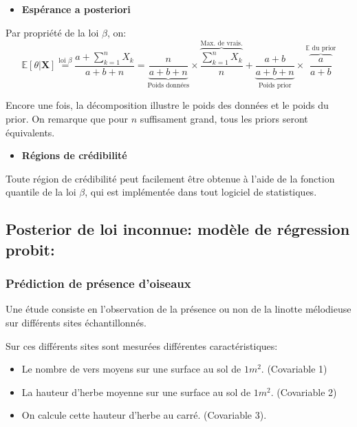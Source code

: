 \documentclass[]{article}
\providecommand{\tightlist}{%
  \setlength{\itemsep}{0pt}\setlength{\parskip}{0pt}}
\begin{document}
\begin{itemize}
\tightlist
\item
  \textbf{Espérance a posteriori}
\end{itemize}

Par propriété de la loi \(\beta\), on:
\[\mathbb{E}[\theta \vert \mathbf{X}] \overset{\text{loi } \beta}{=} \frac{a + \sum_{k = 1}^n X_k}{a + b + n} = \underbrace{\frac{n}{a + b + n}}_{\text{Poids données}}\times \overbrace{\frac{\sum_{k=1}^n X_k}{n}}^{\text{Max. de vrais.}} + \underbrace{\frac{a + b}{a + b + n}}_{\text{Poids prior}} \times \overbrace{\frac{a}{a + b}}^{\mathbb{E}\text{ du prior}}\]

Encore une fois, la décomposition illustre le poids des données et le
poids du prior. On remarque que pour \(n\) suffisament grand, tous les
priors seront équivalents.

\begin{itemize}
\tightlist
\item
  \textbf{Régions de crédibilité}
\end{itemize}

Toute région de crédibilité peut facilement être obtenue à l'aide de la
fonction quantile de la loi \(\beta\), qui est implémentée dans tout
logiciel de statistiques.

\hypertarget{posterior-de-loi-inconnue-moduxe8le-de-ruxe9gression-probit}{%
\subsection{Posterior de loi inconnue: modèle de régression
probit:}\label{posterior-de-loi-inconnue-moduxe8le-de-ruxe9gression-probit}}

\hypertarget{pruxe9diction-de-pruxe9sence-doiseaux}{%
\subsubsection{Prédiction de présence
d'oiseaux}\label{pruxe9diction-de-pruxe9sence-doiseaux}}

Une étude consiste en l'observation de la présence ou non de la linotte
mélodieuse sur différents sites échantillonnés.

Sur ces différents sites sont mesurées différentes caractéristiques:

\begin{itemize}
\tightlist
\item
  Le nombre de vers moyens sur une surface au sol de \(1m^2\).
  (Covariable 1)
\item
  La hauteur d'herbe moyenne sur une surface au sol de \(1m^2\).
  (Covariable 2)
\item
  On calcule cette hauteur d'herbe au carré. (Covariable 3).
\end{itemize}
\end{document}
